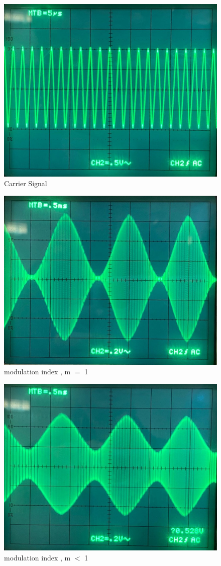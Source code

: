 \documentclass[a4paper,12pt]{article}
\begin{document}
    	\begin{figure}[H]
    	\centering
    	\includegraphics[width=.65\linewidth, height=0.26\textheight]{"Images/2"}
    	\caption{Carrier Signal}
    \end{figure}
    
    	\begin{figure}[H]
    	\centering
    	\includegraphics[width=.65\linewidth, height=0.26\textheight]{"Images/3"}
    	\caption{modulation index , m $=$ 1}
    \end{figure}
    
    	\begin{figure}[H]
    	\centering
    	\includegraphics[width=.65\linewidth, height=0.26\textheight]{"Images/4"}
    	\caption{modulation index , m $<$ 1}
    \end{figure}
    
\end{document}
